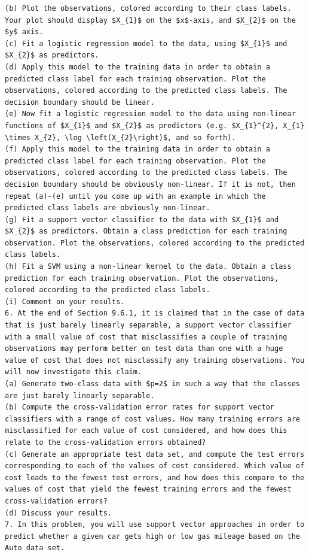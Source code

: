 \documentclass[10pt]{article}
\begin{document}
\begin{verbatim}
(b) Plot the observations, colored according to their class labels. Your plot should display $X_{1}$ on the $x$-axis, and $X_{2}$ on the $y$ axis.
(c) Fit a logistic regression model to the data, using $X_{1}$ and $X_{2}$ as predictors.
(d) Apply this model to the training data in order to obtain a predicted class label for each training observation. Plot the observations, colored according to the predicted class labels. The decision boundary should be linear.
(e) Now fit a logistic regression model to the data using non-linear functions of $X_{1}$ and $X_{2}$ as predictors (e.g. $X_{1}^{2}, X_{1} \times X_{2}, \log \left(X_{2}\right)$, and so forth).
(f) Apply this model to the training data in order to obtain a predicted class label for each training observation. Plot the observations, colored according to the predicted class labels. The decision boundary should be obviously non-linear. If it is not, then repeat (a)-(e) until you come up with an example in which the predicted class labels are obviously non-linear.
(g) Fit a support vector classifier to the data with $X_{1}$ and $X_{2}$ as predictors. Obtain a class prediction for each training observation. Plot the observations, colored according to the predicted class labels.
(h) Fit a SVM using a non-linear kernel to the data. Obtain a class prediction for each training observation. Plot the observations, colored according to the predicted class labels.
(i) Comment on your results.
6. At the end of Section 9.6.1, it is claimed that in the case of data that is just barely linearly separable, a support vector classifier with a small value of cost that misclassifies a couple of training observations may perform better on test data than one with a huge value of cost that does not misclassify any training observations. You will now investigate this claim.
(a) Generate two-class data with $p=2$ in such a way that the classes are just barely linearly separable.
(b) Compute the cross-validation error rates for support vector classifiers with a range of cost values. How many training errors are misclassified for each value of cost considered, and how does this relate to the cross-validation errors obtained?
(c) Generate an appropriate test data set, and compute the test errors corresponding to each of the values of cost considered. Which value of cost leads to the fewest test errors, and how does this compare to the values of cost that yield the fewest training errors and the fewest cross-validation errors?
(d) Discuss your results.
7. In this problem, you will use support vector approaches in order to predict whether a given car gets high or low gas mileage based on the Auto data set.

\end{verbatim}
\end{document}
